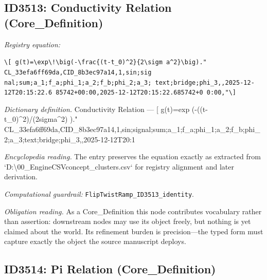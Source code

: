 \documentclass[11pt]{article}
\theoremstyle{remark}
\begin{document}
\subsection{ID3513: Conductivity Relation (Core\_Definition)}

\noindent\textit{Registry equation:}\par
{\small\texttt{\textbackslash{}[ g(t)=\textbackslash{}exp\textbackslash{}!\textbackslash{}big(-\textbackslash{}frac\{(t-t\_0)\textasciicircum{}2\}\{2\textbackslash{}sigm a\textasciicircum{}2\}\textbackslash{}big)." CL\_33efa6ff69da,CID\_8b3ec97a14,1,sin;sig nal;sum;a\_1;f\_a;phi\_1;a\_2;f\_b;phi\_2;a\_3; text;bridge;phi\_3,,2025-12-12T20:15:22.6 85742+00:00,2025-12-12T20:15:22.685742+0 0:00,"\textbackslash{}]}}\par\medskip
\noindent\textit{Dictionary definition.} Conductivity Relation --- [ g(t)=exp (-((t-t\_0)\textasciicircum{}2)/(2sigma\textasciicircum{}2) )." CL\_33efa6ff69da,CID\_8b3ec97a14,1,sin;signal;sum;a\_1;f\_a;phi\_1;a\_2;f\_b;phi\_2;a\_3;text;bridge;phi\_3,,2025-12-12T20:1\par\medskip
\noindent\textit{Encyclopedia reading.} The entry preserves the equation exactly as extracted from `D:\textbackslash{}00\_EngineCSVconcept\_clusters.csv` for registry alignment and later derivation.
\par\medskip\noindent\textit{Computational guardrail:} \texttt{FlipTwistRamp\_ID3513\_identity}.
\par\medskip\noindent\textit{Obligation reading.} As a Core\_Definition this node contributes vocabulary rather than assertion: downstream nodes may use its object freely, but nothing is yet claimed about the world. Its refinement burden is precision---the typed form must capture exactly the object the source manuscript deploys.

\subsection{ID3514: Pi Relation (Core\_Definition)}
\end{document}
